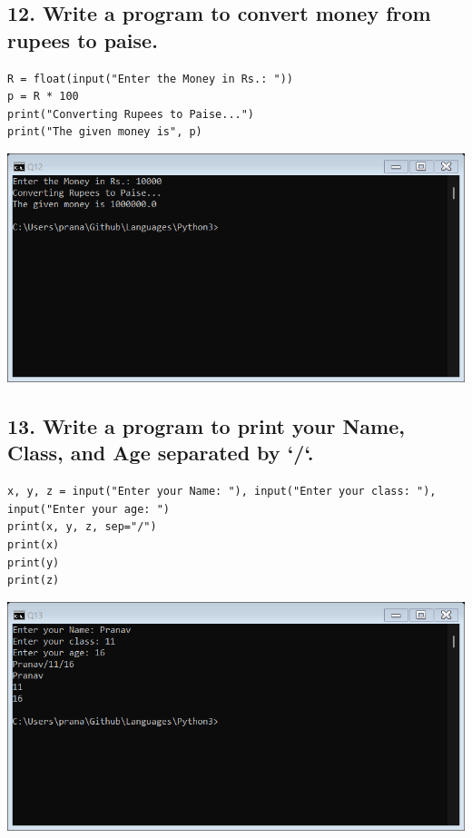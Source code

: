 \documentclass[12pt]{article}
\begin{document}
\subsection*{12. Write a program to convert money from rupees to paise.}
\begin{verbatim}
R = float(input("Enter the Money in Rs.: "))
p = R * 100
print("Converting Rupees to Paise...")
print("The given money is", p)
\end{verbatim}
\includegraphics[width=\linewidth]{images/12.png}

\subsection*{13. Write a program to print your Name, Class, and Age separated by `/`.}
\begin{verbatim}
x, y, z = input("Enter your Name: "), input("Enter your class: "), input("Enter your age: ")
print(x, y, z, sep="/")
print(x)
print(y)
print(z)
\end{verbatim}
\includegraphics[width=\linewidth]{images/13.png}
\end{document}
